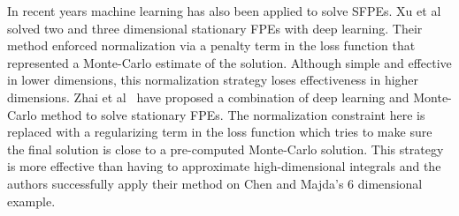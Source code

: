 In recent years machine learning has also been applied to solve SFPEs. Xu et al~\cite{xu2020solving} solved two and three dimensional stationary FPEs with deep learning. Their method enforced normalization via a penalty term in the loss function that represented a Monte-Carlo estimate of the solution. Although simple and effective in lower dimensions, this normalization strategy loses effectiveness in higher dimensions. Zhai et al~\cite{zhai2022deep} have proposed a combination of deep learning and Monte-Carlo method to solve stationary FPEs. The normalization constraint here is replaced with a regularizing term in the loss function which tries to make sure the final solution is close to a pre-computed Monte-Carlo solution. This strategy is more effective than having to approximate high-dimensional integrals and the authors successfully apply their method on Chen and Majda's 6 dimensional example.







